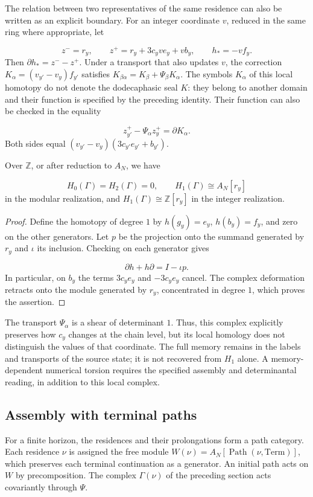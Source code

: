 The relation between two representatives of the same residence can also be written as an explicit boundary. For an integer coordinate \(v\), reduced in the same ring where appropriate, let

\[
z^-=r_y,\qquad z^+=r_y+3c_yv e_y+v b_y,
\qquad h_*=-vf_y.
\]
Then \(\partial h_*=z^--z^+\). Under a transport that also updates \(v\), the correction \(K_\alpha=(v_{y'}-v_y)f_{y'}\) satisfies \(K_{\beta\alpha}=K_\beta+\Psi_\beta K_\alpha\). The symbols \(K_\alpha\) of this local homotopy do not denote the dodecaphasic seal \(K\): they belong to another domain and their function is specified by the preceding identity. Their function can also be checked in the equality

\[
z^+_{y'}-\Psi_\alpha z^+_y=\partial K_\alpha.
\]
Both sides equal \((v_{y'}-v_y)(3c_{y'}e_{y'}+b_{y'})\).

\begin{proposition}
\label{x_reciprocidad:iv:cont:memoria-homologia}
Over \(\mathbb Z\), or after reduction to \(A_N\), we have

\[
H_0(\Gamma)=H_2(\Gamma)=0,
\qquad H_1(\Gamma)\cong A_N[r_y]
\]
in the modular realization, and \(H_1(\Gamma)\cong\mathbb Z[r_y]\) in the integer realization.

\end{proposition}
\begin{proof}
Define the homotopy of degree \(1\) by \(h(g_y)=e_y\), \(h(b_y)=f_y\), and zero on the other generators. Let \(p\) be the projection onto the summand generated by \(r_y\) and \(\iota\) its inclusion. Checking on each generator gives

\[
\partial h+h\partial=I-\iota p.
\]
In particular, on \(b_y\) the terms \(3c_ye_y\) and \(-3c_ye_y\) cancel. The complex deformation retracts onto the module generated by \(r_y\), concentrated in degree \(1\), which proves the assertion.
\end{proof}

The transport \(\Psi_\alpha\) is a shear of determinant \(1\). Thus, this complex explicitly preserves how \(c_y\) changes at the chain level, but its local homology does not distinguish the values of that coordinate. The full memory remains in the labels and transports of the source state; it is not recovered from \(H_1\) alone. A memory-dependent numerical torsion requires the specified assembly and determinantal reading, in addition to this local complex.

\subsection{Assembly with terminal paths}
\label{x_reciprocidad:iv:cont:ensamblaje}
For a finite horizon, the residences and their prolongations form a path category. Each residence \(\nu\) is assigned the free module \(W(\nu)=A_N[\operatorname{Path}(\nu,\mathrm{Term})]\), which preserves each terminal continuation as a generator. An initial path acts on \(W\) by precomposition. The complex \(\Gamma(\nu)\) of the preceding section acts covariantly through \(\Psi\).

